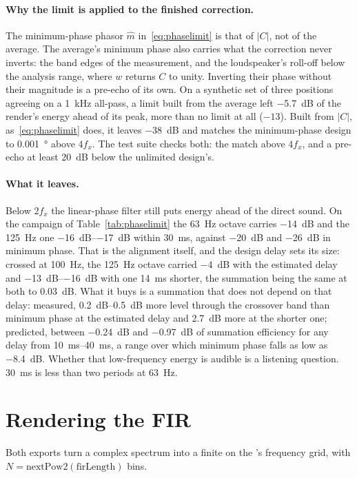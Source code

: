 \paragraph{Why the limit is applied to the finished correction.} The minimum-phase phasor $\hat m$ in~\eqref{eq:phaselimit} is that of $|C|$, not of the average. The average's minimum phase also carries what the correction never inverts: the band edges of the measurement, and the loudspeaker's roll-off below the analysis range, where $w$ returns $C$ to unity. Inverting their phase without their magnitude is a pre-echo of its own. On a synthetic set of three positions agreeing on a \SI{1}{\kilo\hertz} all-pass, a limit built from the average left \SI{-5.7}{\dB} of the render's energy ahead of its peak, more than no limit at all ($-13$). Built from $|C|$, as~\eqref{eq:phaselimit} does, it leaves \SI{-38}{\dB} and matches the minimum-phase design to \SI{0.001}{\degree} above $4f_x$. The test suite checks both: the match above $4f_x$, and a pre-echo at least \SI{20}{\dB} below the unlimited design's.

\paragraph{What it leaves.} Below $2f_x$ the linear-phase filter still puts energy ahead of the direct sound. On the campaign of Table~\ref{tab:phaselimit} the \SI{63}{\hertz} octave carries \SI{-14}{\dB} and the \SI{125}{\hertz} one \SIrange{-16}{-17}{\dB} within \SI{30}{\milli\second}, against \SI{-20}{\dB} and \SI{-26}{\dB} in minimum phase. That is the alignment itself, and the design delay sets its size: crossed at \SI{100}{\hertz}, the \SI{125}{\hertz} octave carried \SI{-4}{\dB} with the estimated delay and \SIrange{-13}{-16}{\dB} with one \SI{14}{\milli\second} shorter, the summation being the same at both to \SI{0.03}{\dB}. What it buys is a summation that does not depend on that delay: measured, \SIrange{0.2}{0.5}{\dB} more level through the crossover band than minimum phase at the estimated delay and \SI{2.7}{\dB} more at the shorter one; predicted, between \SI{-0.24}{\dB} and \SI{-0.97}{\dB} of summation efficiency for any delay from \SIrange{10}{40}{\milli\second}, a range over which minimum phase falls as low as \SI{-8.4}{\dB}. Whether that low-frequency energy is audible is a listening question. \SI{30}{\milli\second} is less than two periods at \SI{63}{\hertz}.

\section{Rendering the FIR}\label{sec:threnders}
Both exports turn a complex spectrum into a finite  on the 's frequency grid, with $N=\text{nextPow2}(\text{firLength})$ bins.

